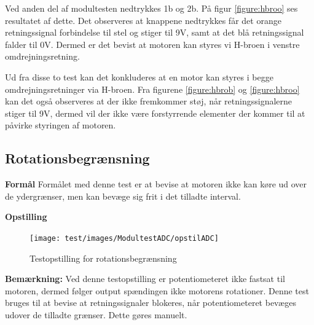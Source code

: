 \noindent Ved anden del af modultesten nedtrykkes 1b og 2b. På figur \ref{figure:hbroo} ses resultatet af dette. Det observeres at knappene nedtrykkes får det orange retningssignal forbindelse til stel og stiger til 9V, samt at det blå retningssignal falder til 0V. Dermed er det bevist at motoren kan styres vi H-broen i venstre omdrejningsretning. \newline

\noindent Ud fra disse to test kan det konkluderes at en motor kan styres i begge omdrejningsretninger via H-broen. Fra figurene \ref{figure:hbrob} og \ref{figure:hbroo} kan det også observeres at der ikke fremkommer støj, når retningssignalerne stiger til 9V, dermed vil der ikke være forstyrrende elementer der kommer til at påvirke styringen af motoren. \newline


\subsection{Rotationsbegrænsning}
\noindent \textbf{Formål} \newline
\noindent Formålet med denne test er at bevise at motoren ikke kan køre ud over de ydergrænser, men kan bevæge sig frit i det tilladte interval. \newline

\noindent \textbf{Opstilling}
\begin{figure}[H]
	\centering
	\texttt{[image: test/images/ModultestADC/opstilADC]}
	\caption{Testopstilling for rotationsbegrænsning}
\end{figure}

\noindent \textbf{Bemærkning: }Ved denne testopstilling er potentiometeret ikke fastsat til motoren, dermed følger output spændingen ikke motorens rotationer. Denne test bruges til at bevise at retningssignaler blokeres, når potentiometeret bevæges udover de tilladte grænser. Dette gøres manuelt. 

